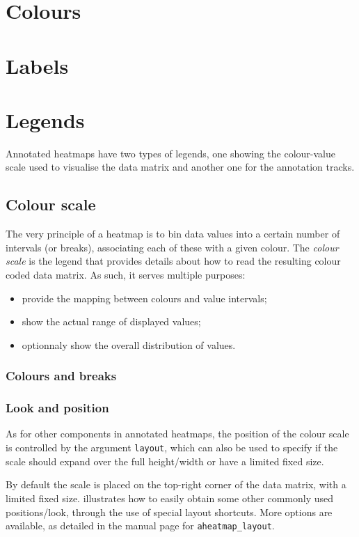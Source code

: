 \documentclass[a4paper]{article}\usepackage[]{graphicx}\usepackage[]{color}
\let\code=\texttt
\begin{document}
\section{Colours}
\section{Labels}

\section{Legends}
Annotated heatmaps have two types of legends, one showing the colour-value scale
used to visualise the data matrix and another one for the annotation tracks.

\subsection{Colour scale}
The very principle of a heatmap is to bin data values into a certain number
of intervals (or breaks), associating each of these with a given colour.
The \emph{colour scale} is the legend that provides details about how to read
the resulting colour coded data matrix.
As such, it serves multiple purposes:
\begin{itemize}
  \item provide the mapping between colours and value intervals;
  \item show the actual range of displayed values;
  \item optionnaly show the overall distribution of values.
\end{itemize}

\subsubsection{Colours and breaks}

\subsubsection{Look and position}
As for other components in annotated heatmaps, the position of the
colour scale is controlled by the argument \code{layout}, which can also be used
to specify if the scale should expand over the full height/width or have a
limited fixed size.

By default the scale is placed on the top-right corner of the data matrix, with
a limited fixed size.
 illustrates how to easily obtain some other commonly
used positions/look, through the use of special layout shortcuts.
More options are available, as detailed in the manual page for
\code{aheatmap\_layout}.
\end{document}
